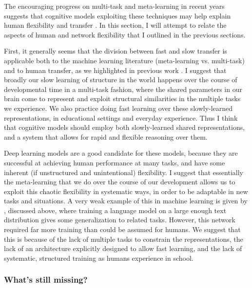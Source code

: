 \documentclass[11pt]{article}
\begin{document}
The encouraging progress on multi-task and meta-learning in recent years suggests that cognitive models exploiting these techniques may help explain human flexibility and transfer \citep{Hansen2017}. In this section, I will attempt to relate the aspects of human and network flexibility that I outlined in the previous sections. \par 
First, it generally seems that the division between fast and slow transfer is applicable both to the machine learning literature (meta-learning vs. multi-task) and to human transfer, as we highlighted in previous work \citep{Lampinen2017a}. I suggest that broadly our slow learning of structure in the world happens over the course of developmental time in a multi-task fashion, where the shared parameters in our brain come to represent and exploit structural similarities in the multiple tasks we experience. We also practice doing fast learning over these slowly-learned representations, in educational settings and everyday experience. Thus I think that cognitive models should employ both slowly-learned shared representations, and a system that allows for rapid and flexible reasoning over them. \par 
Deep learning models are a good candidate for these models, because they are successful at achieving human performance at many tasks, and have some inherent (if unstructured and unintentional) flexibility. I suggest that essentially the meta-learning that we do over the course of our development allows us to exploit this chaotic flexibility in systematic ways, in order to be adaptable in new tasks and situations. A very weak example of this in machine learning is given by \citet{Radford2019}, discussed above, where training a language model on a large enough text distribution gives some generalization to related tasks. However, this network required far more training than could be assumed for humans. We suggest that this is because of the lack of multiple tasks to constrain the representations, the lack of an architecture explicitly designed to allow fast learning, and the lack of systematic, structured training as humans experience in school. \par 

\subsubsection{What's still missing?}
\end{document}
